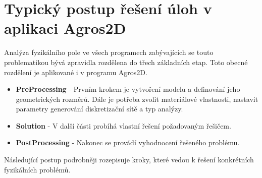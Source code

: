 \section{Typický postup řešení úloh v aplikaci Agros2D} 
Analýza fyzikálního pole ve všech programech zabývajících se touto problematikou bývá zpravidla rozdělena do třech základních etap. Toto obecné rozdělení je aplikované i v programu Agros2D.
\begin{itemize}
\item {\bf PreProcessing} - Prvním krokem je vytvoření modelu a definování jeho geometrických rozměrů. Dále je potřeba zvolit materiálové vlastnosti, nastavit parametry generování diskretizační sítě a typ analýzy.
\item {\bf Solution} - V další části probíhá vlastní řešení požadovaným řešičem.
\item {\bf PostProcessing} - Nakonec se provádí vyhodnocení řešeného problému.
\end{itemize}
Následující postup podrobněji rozepisuje kroky, které vedou k řešení konkrétních fyzikálních problémů.
